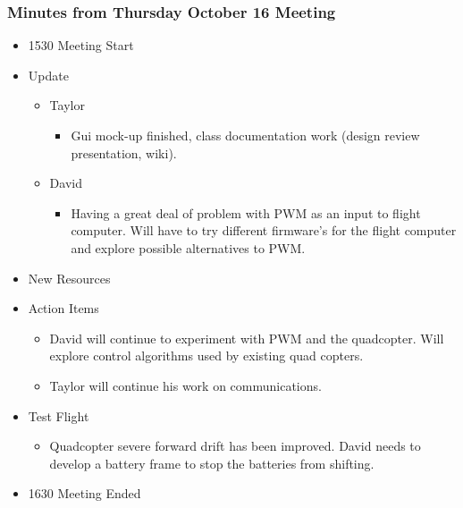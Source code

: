 \documentclass[pdftex,11pt]{article}
\begin{document}
\subsubsection[short]{Minutes from Thursday October 16 Meeting}
\begin{itemize}
	\item 1530 \indent Meeting Start
	\item Update
	\begin{itemize}
		\item Taylor
		\begin{itemize}
			\item Gui mock-up finished, class documentation work (design review presentation, wiki).
		\end{itemize}
		\item David
		\begin{itemize}
			\item  Having a great deal of problem with PWM as an input to flight computer.   Will have to try different firmware's for the flight computer and explore possible alternatives to PWM.
		\end{itemize}
	\end{itemize}
	\item New Resources
		\begin{itemize}

		\end{itemize}
	\item Action Items
	\begin{itemize}
		\item David will continue to experiment with PWM and the quadcopter.   Will explore control algorithms used by existing quad copters.
		\item Taylor will continue his work on communications.
	\end{itemize}
	\item Test Flight
	\begin{itemize}
		\item  Quadcopter severe forward drift has been improved. David needs to develop a battery frame to stop the batteries from shifting.
	\end{itemize}
	\item 1630 \indent Meeting Ended
\end{itemize}	


\clearpage

\end{document}
